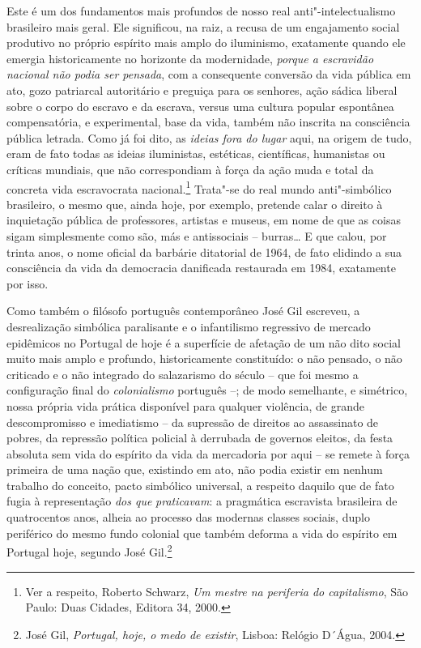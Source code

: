 Este é um dos fundamentos mais profundos de nosso real
anti"-intelectualismo brasileiro mais geral. Ele significou, na raiz, a
recusa de um engajamento social produtivo no próprio espírito mais amplo
do iluminismo, exatamente quando ele emergia historicamente no horizonte
da modernidade, \emph{porque a escravidão nacional não podia ser
pensada}, com a consequente conversão da vida pública em ato, gozo
patriarcal autoritário e preguiça para os senhores, ação sádica liberal
sobre o corpo do escravo e da escrava, versus uma cultura popular
espontânea compensatória, e experimental, base da vida, também não
inscrita na consciência pública letrada. Como já foi dito, as
\emph{ideias fora do lugar} aqui, na origem de tudo, eram de fato todas
as ideias iluministas, estéticas, científicas, humanistas ou críticas
mundiais, que não correspondiam à força da ação muda e total da concreta
vida escravocrata nacional.\footnote{Ver a respeito, Roberto Schwarz,
  \emph{Um mestre na periferia do capitalismo}, São Paulo: Duas Cidades,
  Editora 34, 2000.} Trata"-se do real mundo anti"-simbólico brasileiro, o
mesmo que, ainda hoje, por exemplo, pretende calar o direito à
inquietação pública de professores, artistas e museus, em nome de que as
coisas sigam simplesmente como são, más e antissociais -- burras\ldots{} E
que calou, por trinta anos, o nome oficial da barbárie ditatorial de
1964, de fato elidindo a sua consciência da vida da democracia
danificada restaurada em 1984, exatamente por isso.

Como também o filósofo português contemporâneo José Gil escreveu, a
desrealização simbólica paralisante e o infantilismo regressivo de
mercado epidêmicos no Portugal de hoje é a superfície de afetação de um
não dito social muito mais amplo e profundo, historicamente constituído:
o não pensado, o não criticado e o não integrado do salazarismo do
século  -- que foi mesmo a configuração final do \emph{colonialismo}
português --; de modo semelhante, e simétrico, nossa própria vida
prática disponível para qualquer violência, de grande descompromisso e
imediatismo -- da supressão de direitos ao assassinato de pobres, da
repressão política policial à derrubada de governos eleitos, da festa
absoluta sem vida do espírito da vida da mercadoria por aqui -- se
remete à força primeira de uma nação que, existindo em ato, não podia
existir em nenhum trabalho do conceito, pacto simbólico universal, a
respeito daquilo que de fato fugia à representação \emph{dos que}
\emph{praticavam}: a pragmática escravista brasileira de quatrocentos
anos, alheia ao processo das modernas classes sociais, duplo periférico
do mesmo fundo colonial que também deforma a vida do espírito em
Portugal hoje, segundo José Gil.\footnote{José Gil, \emph{Portugal, hoje,
  o medo de existir}, Lisboa: Relógio D´Água, 2004.}

